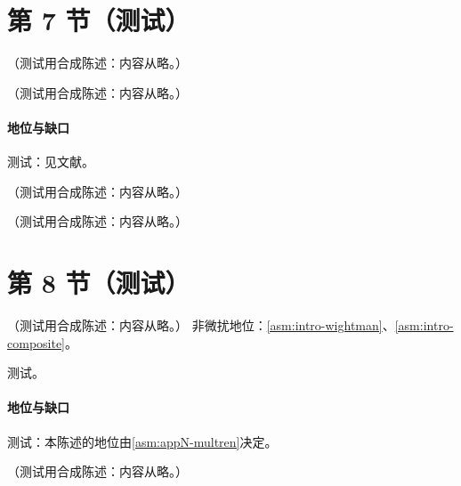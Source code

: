 \section{第 7 节（测试）}\label{sec:pdf-dis}

\begin{remark}[方案变换]\label{rem:pdf-schemes}
（测试用合成陈述：内容从略。）
\end{remark}

\begin{conjecture}\label{conj:pdf-positivity}
（测试用合成陈述：内容从略。）
\end{conjecture}
\paragraph{地位与缺口}测试：见文献。

\begin{definition}[碎裂函数]\label{def:pdf-ff}
（测试用合成陈述：内容从略。）
\end{definition}

\begin{remark}[碎裂函数的乘法可重整性是独立输入]\label{rem:pdf-ff-multren}
（测试用合成陈述：内容从略。）
\end{remark}

\section{第 8 节（测试）}\label{sec:pdf-sumrules}

\begin{proposition}\label{prop:pdf-timelike-dglap}
（测试用合成陈述：内容从略。）
非微扰地位：\cref{asm:intro-wightman}、\cref{asm:intro-composite}。
\end{proposition}
\begin{proofsketch}测试。\end{proofsketch}
\paragraph{地位与缺口}测试：本陈述的地位由\cref{asm:appN-multren}决定。

\begin{definition}[螺旋度与横度分布]\label{def:pdf-polarized}
（测试用合成陈述：内容从略。）
\end{definition}
